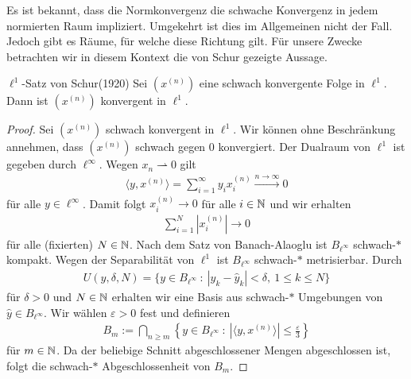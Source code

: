 Es ist bekannt, dass die Normkonvergenz die schwache Konvergenz in jedem normierten Raum impliziert.
Umgekehrt ist dies im Allgemeinen nicht der Fall. 
Jedoch gibt es Räume, für welche diese Richtung gilt.
Für unsere Zwecke betrachten wir in diesem Kontext die von Schur\cite{Schur1920} gezeigte Aussage.


\begin{genericthm}{$ \ell^1 $-Satz von Schur(1920)}\label{th:schur_l1}
	Sei $ (x^{(n)}) $ eine schwach konvergente Folge in $ \ell^1 $.
	Dann ist $ (x^{(n)}) $ konvergent in $ \ell^1 $.
\end{genericthm}
\begin{proof}
	Sei $ (x^{(n)}) $ schwach konvergent in $ \ell^1 $.
	Wir können ohne Beschränkung annehmen, dass $ (x^{(n)}) $ schwach gegen $ 0 $ konvergiert.
	Der Dualraum von $ \ell^1 $ ist gegeben durch $ \ell^\infty $. Wegen $ x_n \rightharpoonup 0 $ gilt
	\begin{align*}
		\langle
		y, x^{(n)} 
		\rangle
		= \sum \limits_{i = 1}^\infty y_i x_i^{(n)} \overset{n \to \infty}{\rightarrow} 0
	\end{align*}
	für alle $ y \in \ell^\infty $.
	Damit folgt $ x^{(n)}_i \rightarrow 0 $ für alle $ i \in \mathbb{N} $ und wir erhalten
	\begin{align*}
		\sum \limits_{i = 1 }^N | x^{(n)}_i | \rightarrow 0
	\end{align*}
	für alle (fixierten) $ N \in \mathbb{N}  $.
	Nach dem Satz von Banach-Alaoglu ist $ B_{\ell^\infty} $ schwach-$ \ast $ kompakt.
	Wegen der Separabilität von $ \ell^1 $ ist $ B_{\ell^\infty} $ schwach-$ \ast $ metrisierbar.
	Durch 
	\begin{align*}
		U(\hat{y},\delta,N)
		=
		\{
		y \in B_{\ell^\infty} \ : \
		|y_k - \hat{y}_k| < \delta , \ 1 \leq k \leq N
		\}
	\end{align*}
	für $ \delta > 0 $ und $ N \in \mathbb{N} $ erhalten wir eine Basis aus schwach-$ * $ Umgebungen von $ \hat{y} \in B_{\ell^\infty} $.
	Wir wählen $ \varepsilon > 0  $ fest und definieren
	\begin{align*}
		B_m 
		:= \bigcap \limits_{n \geq m}
			\left\{
			y \in B_{\ell^\infty} \ : \ |\langle y, x^{(n)} \rangle | \leq \frac{\varepsilon}{3}
			\right\}
	\end{align*}
	für $ m \in \mathbb{N} $.
	Da der beliebige Schnitt abgeschlossener Mengen abgeschlossen ist, folgt die schwach-$ \ast $ Abgeschlossenheit von $ B_m $.

\end{proof}

